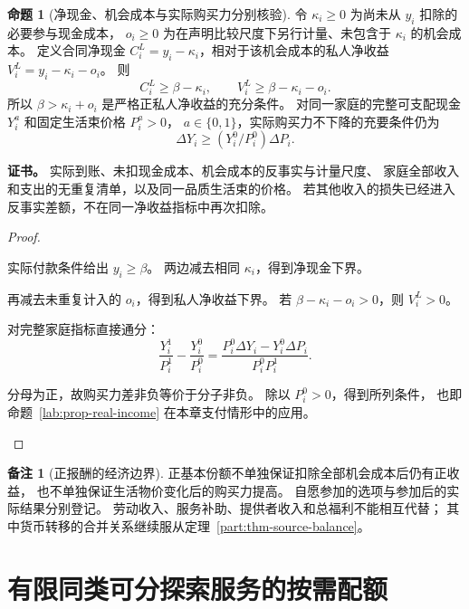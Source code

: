 \documentclass[UTF8,12pt,a4paper,openany,fontset=none,zihao=false]{ctexrep}
\theoremstyle{definition}
\newtheorem{proposition}{命题}[chapter]
\newtheorem{remark}{备注}[chapter]
\newenvironment{certificate}{\par\noindent\textbf{证书。}\ignorespaces}{\par}
\newcommand{\1}{\mathbf 1}
\begin{document}
\begin{proposition}[净现金、机会成本与实际购买力分别核验]
\label{rights:net-income}
令 \(\kappa_i\ge0\) 为尚未从 \(y_i\) 扣除的必要参与现金成本，
\(o_i\ge0\) 为在声明比较尺度下另行计量、未包含于 \(\kappa_i\) 的机会成本。
定义合同净现金 \(C_i^L=y_i-\kappa_i\)，相对于该机会成本的私人净收益
\(V_i^L=y_i-\kappa_i-o_i\)。
则
\[
C_i^L\ge\beta-\kappa_i,\qquad
V_i^L\ge\beta-\kappa_i-o_i.
\]
所以 \(\beta>\kappa_i+o_i\) 是严格正私人净收益的充分条件。
对同一家庭的完整可支配现金 \(Y_i^a\) 和固定生活束价格 \(P_i^a>0\)，
\(a\in\{0,1\}\)，实际购买力不下降的充要条件仍为
\[
\Delta Y_i\ge (Y_i^0/P_i^0)\Delta P_i.
\]
\end{proposition}
\begin{certificate}
实际到账、未扣现金成本、机会成本的反事实与计量尺度、
家庭全部收入和支出的无重复清单，以及同一品质生活束的价格。
若其他收入的损失已经进入反事实差额，不在同一净收益指标中再次扣除。
\end{certificate}
\begin{proof}
\begin{semanticsteps}
\item 实际付款条件给出 \(y_i\ge\beta\)。
两边减去相同 \(\kappa_i\)，得到净现金下界。
\item 再减去未重复计入的 \(o_i\)，得到私人净收益下界。
若 \(\beta-\kappa_i-o_i>0\)，则 \(V_i^L>0\)。
\item 对完整家庭指标直接通分：
\[
\frac{Y_i^1}{P_i^1}-\frac{Y_i^0}{P_i^0}
=\frac{P_i^0\Delta Y_i-Y_i^0\Delta P_i}{P_i^0P_i^1}.
\]
\item 分母为正，故购买力差非负等价于分子非负。
除以 \(P_i^0>0\)，得到所列条件，
也即命题~\ref{lab:prop-real-income} 在本章支付情形中的应用。
\end{semanticsteps}
\end{proof}

\begin{remark}[正报酬的经济边界]
正基本份额不单独保证扣除全部机会成本后仍有正收益，
也不单独保证生活物价变化后的购买力提高。
自愿参加的选项与参加后的实际结果分别登记。
劳动收入、服务补助、提供者收入和总福利不能相互代替；
其中货币转移的合并关系继续服从定理~\ref{part:thm-source-balance}。
\end{remark}

\section{有限同类可分探索服务的按需配额}
\end{document}
